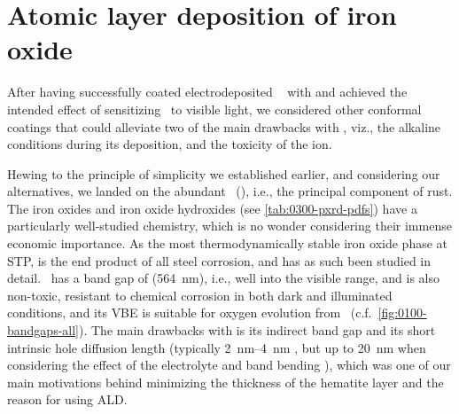 \documentclass[draft,webedition,openright,titles,swedish,english]{LuaUUThesis}\usepackage[]{graphicx}\usepackage[]{xcolor}
\newcommand{\ie}{i.e.}
\newcommand{\viz}{viz.}
\newcommand{\namely}{\viz}
\newcommand{\cf}{c.f.}
\begin{document}
\section{Atomic layer deposition of iron oxide}
\label{synthesis:atomic-layer-deposition}

After having successfully coated electrodeposited \zincox\  with
 and achieved the intended effect of sensitizing \ZnO\ to visible
light, we considered other conformal coatings
that could alleviate two of the main drawbacks with , \namely,
the alkaline conditions during its deposition, and the toxicity of the  ion.

Hewing to the principle of simplicity we established earlier, and considering
our alternatives, we landed on the abundant
\hematite\ (), \ie, the principal component of rust.
The iron oxides and iron oxide hydroxides (see \cref{tab:0300-pxrd-pdfs}) have
a particularly well-studied
chemistry, which is no wonder considering their immense economic importance.
As the most thermodynamically stable iron oxide phase at \gls{STP},  is
the end product of all steel corrosion, and has as such been studied in detail.
\hematite\ has a band gap of  (\qty{564}{\nm}), \ie, well into the visible
range, and is also non-toxic, resistant to chemical corrosion in both dark and
illuminated conditions, and its \gls{VBE} is suitable for oxygen evolution
from \water\ (\cf\ \cref{fig:0100-bandgaps-all}).
The main drawbacks with  is its indirect band gap and its short
intrinsic hole diffusion length (typically \qtyrange{2}{4}{\nm} \cite{Kennedy1978},
but up to \qty{20}{\nm} when considering the effect of the electrolyte and band bending
\cite{Edvinsson2018}), which was one of our main motivations behind minimizing the thickness
of the \gls{hematite} layer and the reason for using \gls{ALD}.

%

\end{document}
